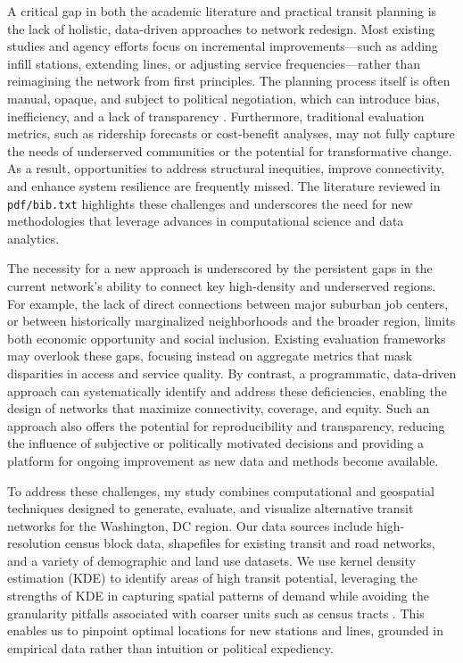 \documentclass[manuscript,screen,review]{acmart}
\begin{document}
A critical gap in both the academic literature and practical transit planning is the lack of holistic, data-driven approaches to network redesign. Most existing studies and agency efforts focus on incremental improvements—such as adding infill stations, extending lines, or adjusting service frequencies—rather than reimagining the network from first principles. The planning process itself is often manual, opaque, and subject to political negotiation, which can introduce bias, inefficiency, and a lack of transparency \cite{bib:camporeale2016equity}. Furthermore, traditional evaluation metrics, such as ridership forecasts or cost-benefit analyses, may not fully capture the needs of underserved communities or the potential for transformative change. As a result, opportunities to address structural inequities, improve connectivity, and enhance system resilience are frequently missed. The literature reviewed in \texttt{pdf/bib.txt} highlights these challenges and underscores the need for new methodologies that leverage advances in computational science and data analytics.

The necessity for a new approach is underscored by the persistent gaps in the current network's ability to connect key high-density and underserved regions. For example, the lack of direct connections between major suburban job centers, or between historically marginalized neighborhoods and the broader region, limits both economic opportunity and social inclusion. Existing evaluation frameworks may overlook these gaps, focusing instead on aggregate metrics that mask disparities in access and service quality. By contrast, a programmatic, data-driven approach can systematically identify and address these deficiencies, enabling the design of networks that maximize connectivity, coverage, and equity. Such an approach also offers the potential for reproducibility and transparency, reducing the influence of subjective or politically motivated decisions and providing a platform for ongoing improvement as new data and methods become available.

To address these challenges, my study combines computational and geospatial techniques designed to generate, evaluate, and visualize alternative transit networks for the Washington, DC region. Our data sources include high-resolution census block data, shapefiles for existing transit and road networks, and a variety of demographic and land use datasets. We use kernel density estimation (KDE) to identify areas of high transit potential, leveraging the strengths of KDE in capturing spatial patterns of demand while avoiding the granularity pitfalls associated with coarser units such as census tracts \cite{bib:silverman1986density}. This enables us to pinpoint optimal locations for new stations and lines, grounded in empirical data rather than intuition or political expediency.
\end{document}
